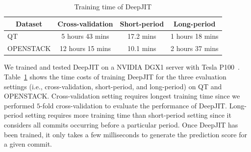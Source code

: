 \begin{table}[t!]
  \centering
  \caption{Training time of DeepJIT}
    \begin{tabular}{|l|c|c|c|}
    \hline
    \multicolumn{1}{|c|}{Dataset} & Cross-validation & Short-period & Long-period \\
    \hline
    \hline
    QT    & 5 hours 43 mins & 17.2 mins & 1 hours 18 mins \\
    \hline
    OPENSTACK & 12 hours 15 mins & 10.1 mins & 2 hours 37 mins \\
    \hline
    \end{tabular}%
  \label{tab:cost}%
\end{table}%

We trained and tested DeepJIT on a NVIDIA DGX1 server with Tesla P100~\cite{gawande2018scaling}. Table~\ref{tab:cost} shows the time costs of training DeepJIT for the three evaluation settings (i.e., cross-validation, short-period, and long-period) on QT and OPENSTACK. Cross-validation setting requires longest training time since we performed $5$-fold cross-validation to evaluate the performance of DeepJIT. Long-period setting requires more training time than short-period setting since it considers all commits occurring before a particular period. Once DeepJIT has been trained, it only takes a few milliseconds to generate the prediction score for a given commit.

